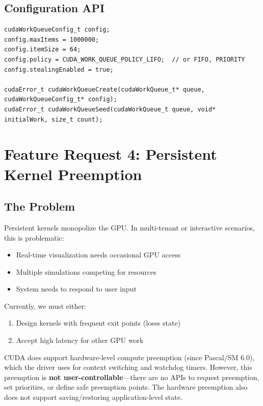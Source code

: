 \documentclass[11pt,a4paper]{article}
\begin{document}
\subsection{Configuration API}

\begin{lstlisting}[style=cstyle,title={Host side - configure work queue}]
cudaWorkQueueConfig_t config;
config.maxItems = 1000000;
config.itemSize = 64;
config.policy = CUDA_WORK_QUEUE_POLICY_LIFO;  // or FIFO, PRIORITY
config.stealingEnabled = true;

cudaError_t cudaWorkQueueCreate(cudaWorkQueue_t* queue, cudaWorkQueueConfig_t* config);
cudaError_t cudaWorkQueueSeed(cudaWorkQueue_t queue, void* initialWork, size_t count);
\end{lstlisting}

\newpage

\section{Feature Request 4: Persistent Kernel Preemption}

\subsection{The Problem}

Persistent kernels monopolize the GPU. In multi-tenant or interactive scenarios, this is problematic:

\begin{itemize}[leftmargin=*]
    \item Real-time visualization needs occasional GPU access
    \item Multiple simulations competing for resources
    \item System needs to respond to user input
\end{itemize}

Currently, we must either:
\begin{enumerate}
    \item Design kernels with frequent exit points (loses state)
    \item Accept high latency for other GPU work
\end{enumerate}

CUDA does support hardware-level compute preemption (since Pascal/SM 6.0), which the driver uses for context switching and watchdog timers. However, this preemption is \textbf{not user-controllable}---there are no APIs to request preemption, set priorities, or define safe preemption points. The hardware preemption also does not support saving/restoring application-level state.
\end{document}
